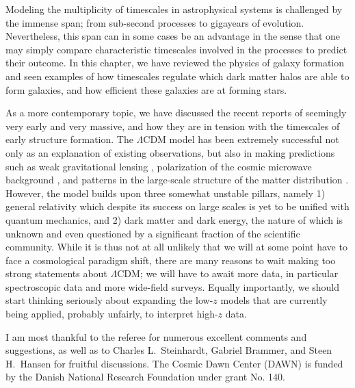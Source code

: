 \documentclass[useAMS]{aa}
\begin{document}
Modeling the multiplicity of timescales in astrophysical systems is challenged by the immense span; from sub-second processes to gigayears of evolution.
Nevertheless, this span can in some cases be an advantage in the sense that one may simply compare characteristic timescales involved in the processes to predict their outcome.
In this chapter, we have reviewed the physics of galaxy formation and seen examples of how timescales regulate which dark matter halos are able to form galaxies, and how efficient these galaxies are at forming stars.

As a more contemporary topic, we have discussed the recent reports of seemingly very early and very massive, and how they are in tension with the timescales of early structure formation.
The $\Lambda$CDM model has been extremely successful not only as an explanation of existing observations, but also in making predictions such as weak gravitational lensing \citep{Fischer2000}, polarization of the cosmic microwave background \citep{Kovac2002}, and patterns in the large-scale structure of the matter distribution
\citep{Eisenstein2005}.
However, the model builds upon three somewhat unstable pillars, namely 1) general relativity which despite its success on large scales is yet to be unified with quantum mechanics, and 2) dark matter and dark energy, the nature of which is unknown and even questioned by a significant fraction of the scientific community.
While it is thus not at all unlikely that we will at some point have to face a cosmological paradigm shift, there are many reasons to wait making too strong statements about $\Lambda$CDM; we will have to await more data, in particular spectroscopic data and more wide-field surveys.
Equally importantly, we should start thinking seriously about expanding the low-$z$ models that are currently being applied, probably unfairly, to interpret high-$z$ data.

\begin{center}
\end{center}

\begin{acknowledgements}
    I am most thankful to the referee for numerous excellent comments and suggestions, as well as to Charles L.~Steinhardt, Gabriel Brammer, and Steen H.~Hansen for fruitful discussions.
    The Cosmic Dawn Center (DAWN) is funded by the Danish National Research Foundation under grant No. 140.
\end{acknowledgements}



\end{document}
